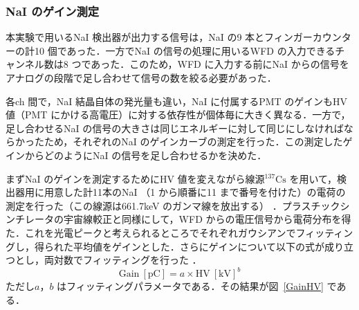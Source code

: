 \subsubsection{NaI のゲイン測定}
本実験で用いるNaI 検出器が出力する信号は，NaI の9 本とフィンガーカウンターの計10 個であった．一方でNaI の信号の処理に用いるWFD の入力できるチャンネル数は8 つであった．このため，WFD に入力する前にNaI からの信号をアナログの段階で足し合わせて信号の数を絞る必要があった．

各ch 間で，NaI 結晶自体の発光量も違い，NaI に付属するPMT のゲインもHV 値（PMT にかける高電圧）に対する依存性が個体毎に大きく異なる．一方で，足し合わせるNaI の信号の大きさは同じエネルギーに対して同じにしなければならかったため，それぞれのNaI のゲインカーブの測定を行った．この測定したゲインからどのようにNaI の信号を足し合わせるかを決めた．

まずNaI のゲインを測定するためにHV 値を変えながら線源${}^{137}\mathrm{Cs}$ を用いて，検出器用に用意した計11本のNaI （1 から順番に11 まで番号を付けた）の電荷の測定を行った（この線源は661.7keV のガンマ線を放出する）\cite{IAEA_ENSDF} ．プラスチックシンチレータの宇宙線較正と同様にして，WFD からの電圧信号から電荷分布を得た．これを光電ピークと考えられるところでそれぞれガウシアンでフィッティングし，得られた平均値をゲインとした．さらにゲインについて以下の式が成り立つとし，両対数でフィッティングを行った\cite{Hamamatsu_PMT} ．
\begin{equation}
\mathrm{Gain}~[\mathrm{pC}] = a \times \mathrm{HV}~[\mathrm{kV}]^b \label{gain_curve}  
\end{equation}
ただし$a， b$ はフィッティングパラメータである．その結果が図~\ref{GainHV} である．

